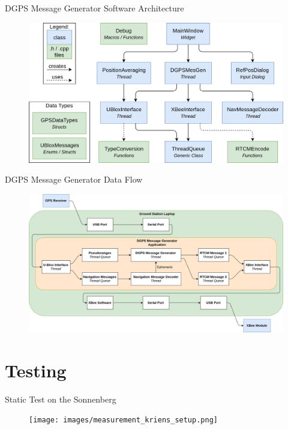 \documentclass[12pt, compress, xcolor=table]{beamer}
\begin{document}
\begin{frame}{DGPS Message Generator Software Architecture}
 \begin{figure}
  \includegraphics[width=\textwidth]{images/Software_Architecture.png}
 \end{figure}
\end{frame}

\begin{frame}{DGPS Message Generator Data Flow}
 \begin{figure}
  \includegraphics[width=\textwidth]{images/Data_Flow.png}
 \end{figure}
\end{frame}


\section{Testing}

\begin{frame}{Static Test on the Sonnenberg}
 \begin{figure}
  \texttt{[image: images/measurement\_kriens\_setup.png]}
 \end{figure}
\end{frame}
\end{document}
